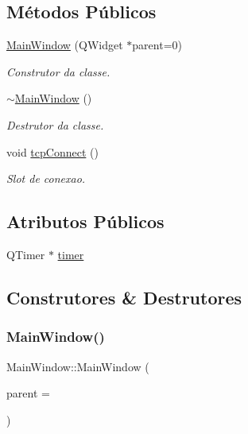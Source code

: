 \subsection*{Métodos Públicos}
\begin{DoxyCompactItemize}
\item 
\hyperlink{class_main_window_a8b244be8b7b7db1b08de2a2acb9409db}{Main\+Window} (Q\+Widget $\ast$parent=0)
\begin{DoxyCompactList}\small\item\em Construtor da classe. \end{DoxyCompactList}\item 
\hyperlink{class_main_window_ae98d00a93bc118200eeef9f9bba1dba7}{$\sim$\+Main\+Window} ()
\begin{DoxyCompactList}\small\item\em Destrutor da classe. \end{DoxyCompactList}\item 
void \hyperlink{class_main_window_ac5b669957c442b6eb68573dacfce33e1}{tcp\+Connect} ()
\begin{DoxyCompactList}\small\item\em Slot de conexao. \end{DoxyCompactList}\end{DoxyCompactItemize}
\subsection*{Atributos Públicos}
\begin{DoxyCompactItemize}
\item 
Q\+Timer $\ast$ \hyperlink{class_main_window_a356578805ed1248a7f2807434cb0e5ee}{timer}
\end{DoxyCompactItemize}


\subsection{Construtores \& Destrutores}
\mbox{\label{class_main_window_a8b244be8b7b7db1b08de2a2acb9409db}} 
\subsubsection{\texorpdfstring{Main\+Window()}{MainWindow()}}
{\footnotesize\ttfamily Main\+Window\+::\+Main\+Window (\begin{DoxyParamCaption}\item[{Q\+Widget $\ast$}]{parent = {} }\end{DoxyParamCaption})\hspace{0.3cm}{\ttfamily [explicit]}}



